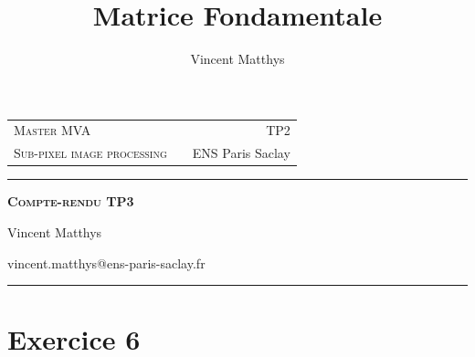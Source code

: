 \documentclass[12pt,a4paper,onecolumn]{article}
\title{Matrice Fondamentale}
\author{Vincent Matthys}
\begin{document}
\begin{tabularx}{0.9\textwidth}{@{} l X r @{} }
	{\textsc{Master MVA}}               &  & \textsc{TP2}       \\
	\textsc{Sub-pixel image processing} &  & {ENS Paris Saclay} \\
\end{tabularx}
\vspace{1.5cm}
\begin{center}

	\rule[11pt]{5cm}{0.5pt}

	\textbf{\LARGE \textsc{Compte-rendu TP3}}
	\vspace{0.5cm}

	Vincent Matthys

	vincent.matthys@ens-paris-saclay.fr

	\rule{5cm}{0.5pt}

	\vspace{1.5cm}
\end{center}

\section{Exercice 6}
\end{document}
